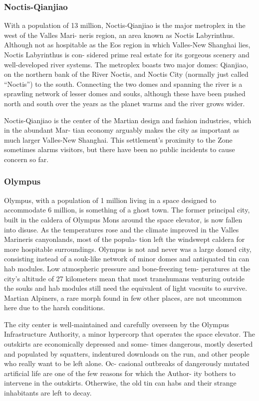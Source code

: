 \subsubsection{Noctis-Qianjiao}

With a population of 13 million, Noctis-Qianjiao is 
the major metroplex in the west of the Valles Mari-
neris region, an area known as Noctis Labyrinthus. 
Although not as hospitable as the Eos region in which 
Valles-New Shanghai lies, Noctis Labyrinthus is con-
sidered prime real estate for its gorgeous scenery and 
well-developed river systems. The metroplex boasts 
two major domes: Qianjiao, on the northern bank 
of the River Noctis, and Noctis City (normally just 
called ``Noctis'') to the south. Connecting the two 
domes and spanning the river is a sprawling network 
of lesser domes and souks, although these have been 
pushed north and south over the years as the planet 
warms and the river grows wider.

Noctis-Qianjiao is the center of the Martian design 
and fashion industries, which in the abundant Mar-
tian economy arguably makes the city as important 
as much larger Valles-New Shanghai. This settlement's 
proximity to the Zone sometimes alarms visitors, but 
there have been no public incidents to cause concern 
so far.

\subsubsection{Olympus}


Olympus, with a population of 1 million living 
in a space designed to accommodate 6 million, is 
something of a ghost town. The former principal 
city, built in the caldera of Olympus Mons around 
the space elevator, is now fallen into disuse. As the 
temperatures rose and the climate improved in the 
Valles Marineris canyonlands, most of the popula-
tion left the windswept caldera for more hospitable 
surroundings. Olympus is not and never was a large 
domed city, consisting instead of a souk-like network 
of minor domes and antiquated tin can hab modules. 
Low atmospheric pressure and bone-freezing tem-
peratures at the city's altitude of 27 kilometers mean 
that most transhumans venturing outside the souks 
and hab modules still need the equivalent of light 
vacsuits to survive. Martian Alpiners, a rare morph 
found in few other places, are not uncommon here 
due to the harsh conditions.

The city center is well-maintained and carefully 
overseen by the Olympus Infrastructure Authority, 
a minor hypercorp that operates the space elevator. 
The outskirts are economically depressed and some-
times dangerous, mostly deserted and populated by 
squatters, indentured downloads on the run, and 
other people who really want to be left alone. Oc-
casional outbreaks of dangerously mutated artificial 
life are one of the few reasons for which the Author-
ity bothers to intervene in the outskirts. Otherwise, 
the old tin can habs and their strange inhabitants are 
left to decay.

